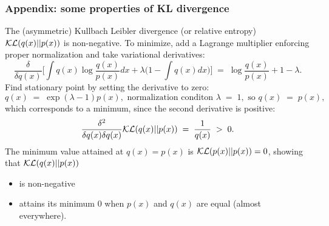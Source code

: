 \documentclass[10pt]{beamer}
\begin{document}
\begin{frame}
\frametitle{Appendix: some properties of KL divergence}

The (asymmetric) Kullbach Leibler divergence (or relative entropy) ${\cal KL}(q(x)||p(x))$ is non-negative. To minimize, add a Lagrange multiplier enforcing proper normalization and take variational derivatives:
\[
\frac{\delta}{\delta q(x)}\Big[\int q(x)\log\frac{q(x)}{p(x)}dx+\lambda\big(1-\int q(x)dx\big)\Big]\;
=\;\log\frac{q(x)}{p(x)}+1-\lambda.
\]
Find stationary point by setting the derivative to zero:
\[
q(x)\;=\;\exp(\lambda-1)p(x),\text{\ \ normalization conditon\ }\lambda\;=\;1, \text{\ \ so\ }q(x)\;=\;p(x),
\]
which corresponds to a minimum, since the second derivative is positive:
\[
\frac{\delta^2}{\delta q(x)\delta q(x)}{\cal KL}(q(x)||p(x))\;=\;\frac{1}{q(x)}\;>\;0.
\]
The minimum value attained at $q(x)=p(x)$ is ${\cal KL}(p(x)||p(x))=0$, showing that 
${\cal KL}(q(x)||p(x))$
\begin{itemize}
\item is non-negative
\item attains its minimum 0 when $p(x)$ and $q(x)$ are equal (almost everywhere).
\end{itemize}
\end{frame}
\end{document}
